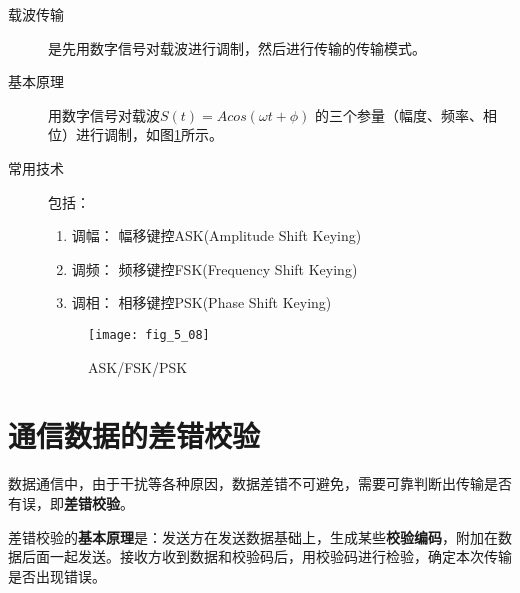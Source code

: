 \begin{description}
  \item[载波传输] 是先用数字信号对载波进行调制，然后进行传输的传输模式。

  \item[基本原理] 用数字信号对载波$S(t)=Acos(\omega t+\phi)$ 的三个参量（幅度、频率、相位）进行调制，如图\ref{fig_5_08}所示。

  \item[常用技术] 包括：

  \begin{enumerate}
    \item 调幅： 幅移键控ASK(Amplitude Shift Keying)
    \item 调频： 频移键控FSK(Frequency Shift Keying)
    \item 调相： 相移键控PSK(Phase Shift Keying)
  \end{enumerate}

\begin{center}
\begin{figure}
  \centering
  \texttt{[image: fig\_5\_08]}\\
  \caption{ASK/FSK/PSK}\label{fig_5_08}
\end{figure}
\end{center}

\end{description}



\section{通信数据的差错校验}
数据通信中，由于干扰等各种原因，数据差错不可避免，需要可靠判断出传输是否有误，即\textbf{差错校验}。

差错校验的\textbf{基本原理}是：发送方在发送数据基础上，生成某些\textbf{校验编码}，附加在数据后面一起发送。接收方收到数据和校验码后，用校验码进行检验，确定本次传输是否出现错误。


